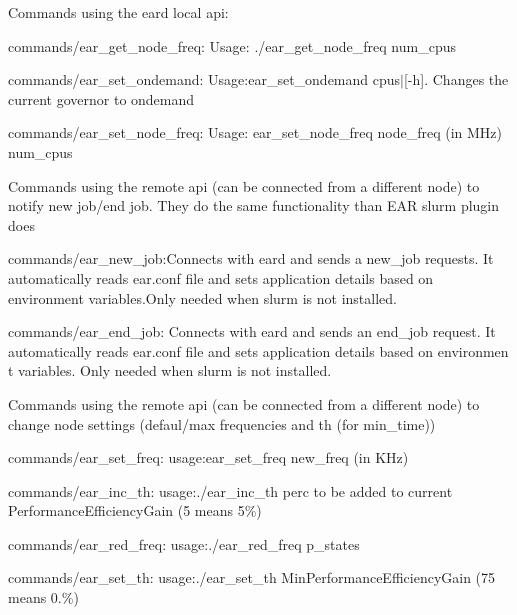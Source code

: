 \begin{DoxyEnumerate}
\item Commands using the eard local api\+:
\begin{DoxyItemize}
\item commands/ear\+\_\+get\+\_\+node\+\_\+freq\+: Usage\+: ./ear\+\_\+get\+\_\+node\+\_\+freq num\+\_\+cpus
\item commands/ear\+\_\+set\+\_\+ondemand\+: Usage\+:ear\+\_\+set\+\_\+ondemand cpus$\vert$\mbox{[}-\/h\mbox{]}. Changes the current governor to ondemand
\item commands/ear\+\_\+set\+\_\+node\+\_\+freq\+: Usage\+: ear\+\_\+set\+\_\+node\+\_\+freq node\+\_\+freq (in M\+Hz) num\+\_\+cpus
\end{DoxyItemize}
\item Commands using the remote api (can be connected from a different node) to notify new job/end job. They do the same functionality than E\+AR slurm plugin does
\begin{DoxyItemize}
\item commands/ear\+\_\+new\+\_\+job\+:Connects with eard and sends a new\+\_\+job requests. It automatically reads ear.\+conf file and sets application details based on environment variables.\+Only needed when slurm is not installed.
\item commands/ear\+\_\+end\+\_\+job\+: Connects with eard and sends an end\+\_\+job request. It automatically reads ear.\+conf file and sets application details based on environmen t variables. Only needed when slurm is not installed.
\end{DoxyItemize}
\item Commands using the remote api (can be connected from a different node) to change node settings (defaul/max frequencies and th (for min\+\_\+time))
\begin{DoxyItemize}
\item commands/ear\+\_\+set\+\_\+freq\+: usage\+:ear\+\_\+set\+\_\+freq new\+\_\+freq (in K\+Hz)
\item commands/ear\+\_\+inc\+\_\+th\+: usage\+:./ear\+\_\+inc\+\_\+th perc to be added to current Performance\+Efficiency\+Gain (5 means 5\%)
\item commands/ear\+\_\+red\+\_\+freq\+: usage\+:./ear\+\_\+red\+\_\+freq p\+\_\+states
\item commands/ear\+\_\+set\+\_\+th\+: usage\+:./ear\+\_\+set\+\_\+th Min\+Performance\+Efficiency\+Gain (75 means 0.\%)
\end{DoxyItemize}
\end{DoxyEnumerate}

